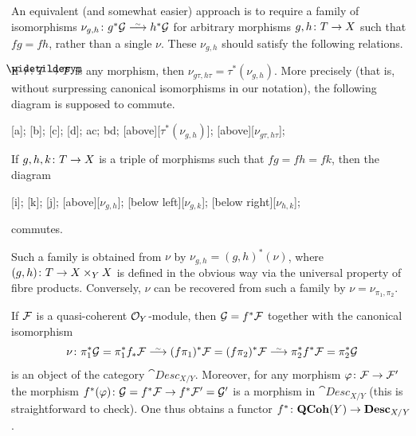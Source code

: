\documentclass[a4paper,parskip=half,numbers=enddot, DIV=12]{scrreprt}
\begin{document}
\begin{rem}
	An equivalent (and somewhat easier) approach is to require a family of isomorphisms $\nu_{g,h}\colon g^*\Gg\isomorphism h^*\Gg$ for arbitrary morphisms $g,h\colon T\morphism X$ such that $fg=fh$, rather than a single $\nu$. These $\nu_{g,h}$ should satisfy the following relations.
		\begin{alphanumerate}
			\item If $\tau\colon \snake{T}\morphism T$ is any morphism, then $\nu_{g\tau,h\tau}=\tau^*(\nu_{g,h})$. More precisely (that is, without surpressing canonical isomorphisms in our notation), the following diagram is supposed to commute.
			\begin{diagram*}
				[a];
				[b];
				[c];
				[d];
				\scriptsize
				\isoarrow ac;
				\isoarrow bd;
				[above][$\tau^*(\nu_{g,h})$];
				[above][$\nu_{g\tau,h\tau}$];
			\end{diagram*}
			\item If $g,h,k\colon T\morphism X$ is a triple of morphisms such that $fg=fh=fk$, then the diagram
			\begin{diagram*}
				\object{0,1.25}{$g^*\Gg$}[i];
				\object{1.25,0}{$h^*\Gg$}[k];
				\object{2.5,1.25}{$k^*\Gg$}[j];
				\scriptsize
				[above][$\nu_{g,h}$];
				[$\nu_{g,k}$];
				[below right][$\nu_{h,k}$];
			\end{diagram*}
			commutes.
		\end{alphanumerate}
		Such a family is obtained from $\nu$ by $\nu_{g,h}=(g,h)^*(\nu)$, where $(g,h)\colon T\morphism X\times_YX$ is defined in the obvious way via the universal property of fibre products. Conversely, $\nu$ can be recovered from such a family by $\nu=\nu_{\pi_1,\pi_2}$.
\end{rem}
\begin{rem}
	If $\mathcal{F}$ is a quasi-coherent $\mathcal{O}_Y$-module, then $\mathcal{G}=f^*\mathcal{F}$ together with the canonical isomorphism
	\begin{align*}
		\nu\colon \pi_1^*\Gg=\pi_1^*f_*\Ff\isomorphism (f\pi_1)^*\Ff=(f\pi_2)^*\Ff\isomorphism \pi_2^*f^*\Ff=\pi_2^*\Gg
	\end{align*}
	is an object of the category $\cat{Desc}_{X/Y}$. Moreover, for any morphism $\phi\colon \Ff\morphism \Ff'$ the morphism $f^*(\phi)\colon \Gg=f^*\Ff\morphism f^*\Ff'=\Gg'$ is a morphism in $\cat{Desc}_{X/Y}$ (this is straightforward to check). One thus obtains a functor $f^*\colon\cat{QCoh}(Y)\morphism \cat{Desc}_{X/Y}$.
\end{rem}
\end{document}
